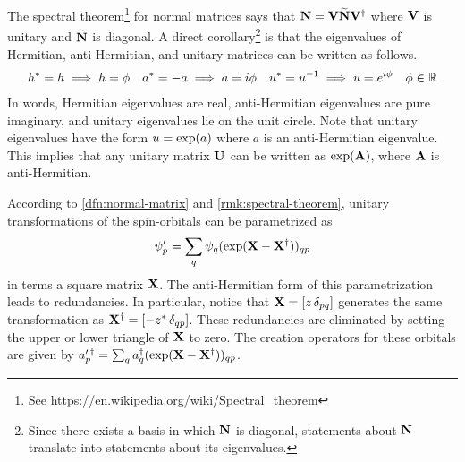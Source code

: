 \documentclass[11pt]{article}
\numberwithin{equation}{section}
\begin{document}
\begin{rmk}
\label{rmk:spectral-theorem}
The spectral theorem\footnote{See \url{https://en.wikipedia.org/wiki/Spectral_theorem}} for normal matrices says that $\mathbf{N}=\mathbf{V}\widetilde{\mathbf{N}}\mathbf{V}^\dagger$ where $\mathbf{V}$ is unitary and $\widetilde{\mathbf{N}}$ is diagonal.
A direct corollary\footnote{Since there exists a basis in which $\mathbf{N}$ is diagonal, statements about $\mathbf{N}$ translate into statements about its eigenvalues.} is that the eigenvalues of Hermitian, anti-Hermitian, and unitary matrices can be written as follows.
\begin{align}
  h^*
=
  h
\implies
  h
=
  \phi 
&&
  a^*
=
-
  a
\implies
  a
=
  i\phi 
&&
  u^*
=
  u^{-1}
\implies
  u
=
  e^{i\phi }
&&
  \phi 
\in
  \mathbb{R}
\end{align}
In words, Hermitian eigenvalues are real, anti-Hermitian eigenvalues are pure imaginary, and unitary eigenvalues lie on the unit circle.
Note that unitary eigenvalues have the form $u=\mathrm{exp}(a)$ where $a$ is an anti-Hermitian eigenvalue.
This implies that any unitary matrix $\mathbf{U}$ can be written as $\mathrm{exp}(\mathbf{A})$, where $\mathbf{A}$ is anti-Hermitian.
\end{rmk}

\begin{rmk}
\label{rmk:spin-orbital-transformation-law}
According to \cref{dfn:normal-matrix} and \cref{rmk:spectral-theorem}, unitary transformations of the spin-orbitals can be parametrized as
\begin{align}
\label{eq:spin-orbital-transformation}
  \psi _p'
=
  \sum_q
  \psi _q
  (\mathrm{exp}(\mathbf{X} - \mathbf{X}^\dagger))_{qp}
\end{align}
in terms a square matrix $\mathbf{X}$.
The anti-Hermitian form of this parametrization leads to redundancies.
In particular, notice that $\mathbf{X}=[z\,\delta _{pq}]$ generates the same transformation as $\mathbf{X}^\dagger=[-z^*\,\delta _{qp}]$.
These redundancies are eliminated by setting the upper or lower triangle of $\mathbf{X}$ to zero.
The creation operators for these orbitals are given by
$
  a_p^{\prime\,\dagger}
=
  \sum_q
  a_q^\dagger
  (\mathrm{exp}(\mathbf{X} - \mathbf{X}^\dagger))_{qp}
$.
\end{rmk}
\end{document}
